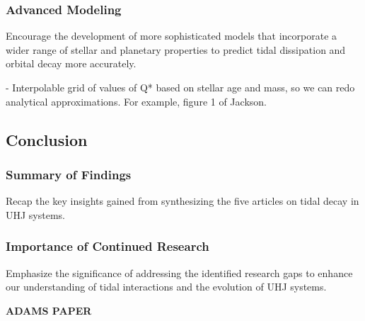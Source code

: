 \documentclass[oneside,12pt]{amsart}
\numberwithin{page}{section}
\begin{document}
\subsubsection{Advanced Modeling}
Encourage the development of more sophisticated models that incorporate a wider range of stellar and planetary properties to predict tidal dissipation and orbital decay more accurately.

- Interpolable grid of values of Q* based on stellar age and mass, so we can redo analytical approximations. For example, figure 1 of Jackson. 


\subsection{Conclusion}

\subsubsection{Summary of Findings}
Recap the key insights gained from synthesizing the five articles on tidal decay in UHJ systems.

\subsubsection{Importance of Continued Research}
Emphasize the significance of addressing the identified research gaps to enhance our understanding of tidal interactions and the evolution of UHJ systems.

\clearpage

\textbf{ADAMS PAPER}
\end{document}
